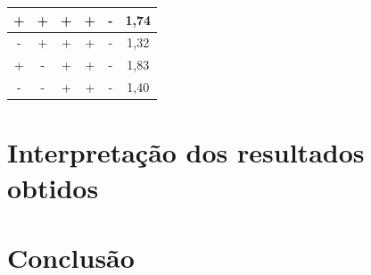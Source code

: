 \documentclass[
12pt,					%
openright,				%
oneside,				%
a4paper,				%
english,
brazil
]{ABNT/abntex2_report}
\begin{document}
\begin{table}[H]
\begin{tabular}{|c|c|c|c|c|c|}
	+              & +               & +                & +                 & -                  & 1,74           \\ \hline
	\rowcolor[HTML]{EFEFEF} 
	-              & +               & +                & +                 & -                  & 1,32           \\ \hline
	+              & -               & +                & +                 & -                  & 1,83           \\ \hline
	\rowcolor[HTML]{EFEFEF} 
	-              & -               & +                & +                 & -                  & 1,40           \\ \hline
	\end{tabular}
	\label{tab:dados_experimento}
	\end{table}


\section*{Interpretação dos resultados obtidos}


\section*{Conclusão}





	\cleardoublepage
	\titleformat{\chapter}[display]{\vspace*{-24pt}\ABNTEXchapterfont\large\bfseries}{\chaptertitlename\ \thechapter}{12pt}{\Large}
	
\end{document}
